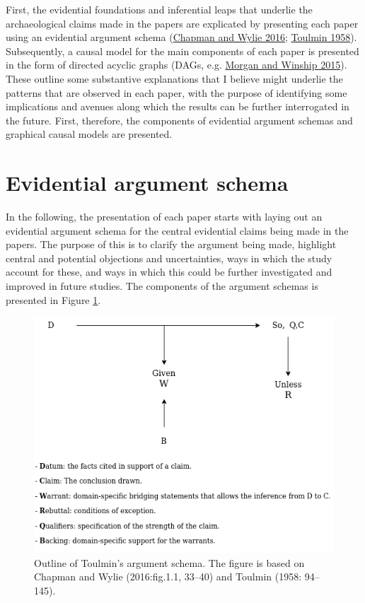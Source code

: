 \documentclass[
  12pt,
  a4paper,
  oneside]{book}
\begin{document}
First, the evidential foundations and inferential leaps that underlie the archaeological claims made in the papers are explicated by presenting each paper using an evidential argument schema (\protect\hyperlink{ref-chapman2016}{Chapman and Wylie 2016}; \protect\hyperlink{ref-toulmin1958}{Toulmin 1958}). Subsequently, a causal model for the main components of each paper is presented in the form of directed acyclic graphs (DAGs, e.g. \protect\hyperlink{ref-morgan2015}{Morgan and Winship 2015}). These outline some substantive explanations that I believe might underlie the patterns that are observed in each paper, with the purpose of identifying some implications and avenues along which the results can be further interrogated in the future. First, therefore, the components of evidential argument schemas and graphical causal models are presented.

\hypertarget{evidential-argument-schema}{%
\section{Evidential argument schema}\label{evidential-argument-schema}}

In the following, the presentation of each paper starts with laying out an evidential argument schema for the central evidential claims being made in the papers. The purpose of this is to clarify the argument being made, highlight central and potential objections and uncertainties, ways in which the study account for these, and ways in which this could be further investigated and improved in future studies. The components of the argument schemas is presented in Figure \ref{fig:argument}.

\begin{figure}

{\centering \includegraphics[width=1\linewidth]{figures/argument_ex} 

}

\caption{Outline of Toulmin's argument schema. The figure is based on Chapman and Wylie (2016:fig.1.1, 33--40) and Toulmin (1958: 94--145).}\label{fig:argument}
\end{figure}
\end{document}
